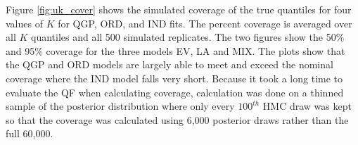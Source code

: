 \documentclass[preprint,12pt,authoryear]{elsarticle}
\begin{document}





Figure \ref{fig:uk_cover} shows the simulated coverage of the true quantiles for four values of $K$ for QGP, ORD, and IND fits. The percent coverage is averaged over all $K$ quantiles and all 500 simulated replicates. The two figures show the 50\% and 95\% coverage for the three models EV, LA and MIX. The plots show that the QGP and ORD models are largely able to meet and exceed the nominal coverage where the IND model falls very short. Because it took a long time to evaluate the QF when calculating coverage, calculation was done on a thinned sample of the posterior distribution where only every $100^{th}$ HMC draw was kept so that the coverage was calculated using 6,000 posterior draws rather than the full 60,000.
\end{document}
